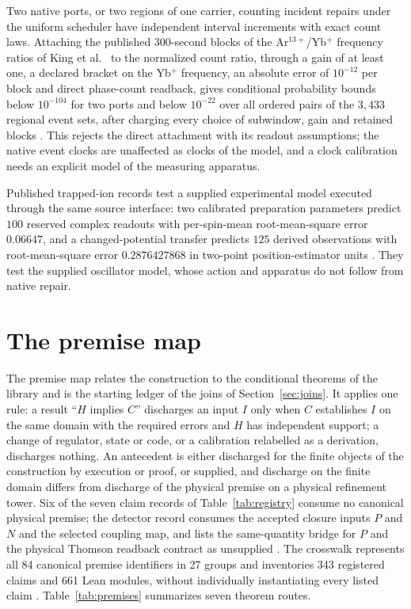 \documentclass[11pt]{article}
\theoremstyle{definition}
\theoremstyle{remark}
\theoremstyle{plain}
\begin{document}
Two native ports, or two regions of one carrier, counting incident repairs
under the uniform scheduler have independent interval increments with exact
count laws. Attaching the published $300$-second blocks of the
Ar$^{13+}$/Yb$^+$ frequency ratios of King et al.\ \cite{king2022} to the
normalized count ratio, through a gain of at least one, a declared bracket on
the Yb$^+$ frequency, an absolute error of $10^{-12}$ per block and direct
phase-count readback, gives conditional probability bounds below $10^{-104}$
for two ports and below $10^{-22}$ over all ordered pairs of the $3{,}433$
regional event sets, after charging every choice of subwindow, gain and
retained blocks \cite{nativePublicData}. This rejects the direct attachment
with its readout assumptions; the native event clocks are unaffected as
clocks of the model, and a clock calibration needs an explicit model of the
measuring apparatus.

Published trapped-ion records test a supplied experimental model executed
through the same source interface: two calibrated preparation parameters
predict $100$ reserved complex readouts with per-spin-mean root-mean-square
error $0.06647$, and a changed-potential transfer predicts $125$ derived
observations with root-mean-square error $0.2876427868$ in two-point
position-estimator units \cite{mREADME}. They test the supplied oscillator
model, whose action and apparatus do not follow from native repair.

\section{The premise map}
\label{sec:premises}

The premise map relates the construction to the conditional theorems of the
library \cite{mPREMISES,mMAP} and is the starting ledger of the joins of
Section~\ref{sec:joins}. It applies one rule: a result ``$H$ implies $C$''
discharges an input $I$ only when $C$ establishes $I$ on the same domain with
the required errors and $H$ has independent support; a change of regulator,
state or code, or a calibration relabelled as a derivation, discharges
nothing. An antecedent is either discharged for the finite objects of the
construction by execution or proof, or supplied, and discharge on the finite
domain differs from discharge of the physical premise on a physical
refinement tower. Six of the seven claim records of Table~\ref{tab:registry}
consume no canonical physical premise; the detector record consumes the
accepted closure inputs $P$ and $N$ and the selected coupling map, and lists
the same-quantity bridge for $P$ and the physical Thomson readback contract as
unsupplied \cite{ophrepo}. The crosswalk represents all 84 canonical premise
identifiers in 27 groups and inventories 343 registered claims and 661 Lean
modules, without individually instantiating every listed claim
\cite{mPREMISES}. Table~\ref{tab:premises} summarizes seven theorem routes.
\end{document}
